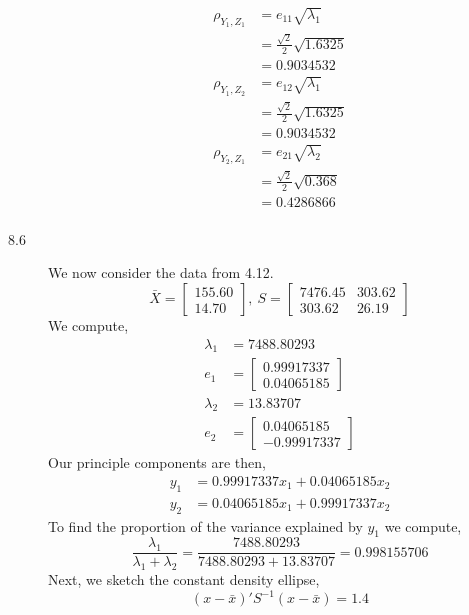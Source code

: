 \documentclass[letterpaper,10pt]{article}
\begin{document}
\begin{description}
\begin{align*}
\rho_{Y_1,Z_1} &= e_{11}\sqrt{\lambda_1}\\
&=\frac{\sqrt{2}}{2}\sqrt{1.6325}\\
&=0.9034532\\
\rho_{Y_1,Z_2} &= e_{12}\sqrt{\lambda_1}\\
&=\frac{\sqrt{2}}{2}\sqrt{1.6325}\\
&=0.9034532\\
\rho_{Y_2,Z_1} &= e_{21}\sqrt{\lambda_2}\\
&=\frac{\sqrt{2}}{2}\sqrt{0.368}\\
&=0.4286866\\
\end{align*}
\item[8.6] We now consider the data from 4.12.
\[\bar{X}=\begin{bmatrix}
155.60\\14.70
\end{bmatrix},\ S=\begin{bmatrix}
7476.45 & 303.62\\303.62 & 26.19
\end{bmatrix} \]
We compute,
\begin{align*}
\lambda_1 &= 7488.80293\\
e_1 &= \begin{bmatrix}
0.99917337\\0.04065185
\end{bmatrix}\\
\lambda_2 &= 13.83707\\
e_2 &= \begin{bmatrix}
0.04065185\\ -0.99917337
\end{bmatrix}
\end{align*}
Our principle components are then,
\begin{align*}
y_1 &= 0.99917337x_1+0.04065185x_2\\
y_2 &= 0.04065185x_1+0.99917337x_2
\end{align*}
To find the proportion of the variance explained by $y_1$ we compute,
\[\frac{\lambda_1}{\lambda_1+\lambda_2}=\frac{7488.80293}{7488.80293+13.83707}=0.998155706\]
Next, we sketch the constant density ellipse,
\[(x-\bar{x})'S^{-1}(x-\bar{x})=1.4\]
\begin{center}

\end{center}
\end{description}
\end{document}
